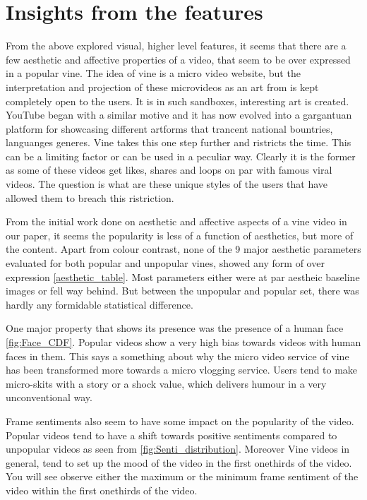 \section{Insights from the features}
From the above explored visual, higher level features, it seems that there are a few aesthetic and affective properties of a video, that seem to be over expressed in a popular vine. The idea of vine is a micro video website, but the interpretation and projection of these microvideos as an art from is kept completely open to the users. It is in such sandboxes, interesting art is created. YouTube began with a similar motive and it has now evolved into a gargantuan platform for showcasing different artforms that trancent national bountries, languanges generes. Vine takes this one step further and ristricts the time. This can be a limiting factor or can be used in a peculiar way. Clearly it is the former as some of these videos get likes, shares and loops on par with famous viral videos. The question is what are these unique styles of the users that have allowed them to breach this ristriction. 
\par 
From the initial work done on aesthetic and affective aspects of a vine video in our paper, it seems the popularity is less of a function of aesthetics, but more of the content. Apart from colour contrast, none of the 9 major aesthetic parameters evaluated for both popular and unpopular vines, showed any form of over expression \ref{aesthetic_table}. Most parameters either were at par aestheic baseline images or fell way behind. But between the unpopular and popular set, there was hardly any formidable statistical difference. 
\par 
One major property that shows its presence was the presence of a human face \ref{fig:Face_CDF}. Popular videos show a very high bias towards videos with human faces in them. This says a something about why the micro video service of vine has been transformed more towards a micro vlogging service. Users tend to make micro-skits with a story or a shock value, which delivers humour in a very unconventional way. 
\par
Frame sentiments also seem to have some impact on the popularity of the video. Popular videos tend to have a shift towards positive sentiments compared to unpopular videos as seen from \ref{fig:Senti_distribution}.
Moreover Vine videos in general, tend to set up the mood of the video in the first onethirds of the video. You will see observe either the maximum or the minimum frame sentiment of the video within the first onethirds of the video. 

